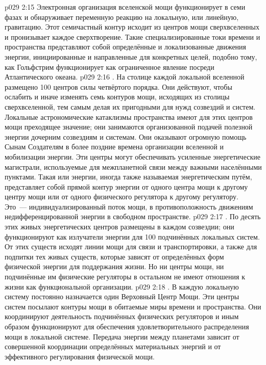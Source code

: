 \vs p029 2:15 Электронная организация вселенской мощи функционирует в семи фазах и обнаруживает переменную реакцию на локальную, или линейную, гравитацию. Этот семичастный контур исходит из центров мощи сверхвселенных и пронизывает каждое сверхтворение. Такие специализированные токи времени и пространства представляют собой определённые и локализованные движения энергии, инициированные и направленные для конкретных целей, подобно тому, как Гольфстрим функционирует как ограниченное явление посреди Атлантического океана.
\vs p029 2:16 . На столице каждой локальной вселенной размещено 100 центров силы четвёртого порядка. Они действуют, чтобы ослабить и иначе изменять семь контуров мощи, исходящих из столицы сверхвселенной, тем самым делая их пригодными для нужд созвездий и систем. Локальные астрономические катаклизмы пространства имеют для этих центров мощи преходящее значение; они занимаются организованной подачей полезной энергии дочерним созвездиям и системам. Они оказывают огромную помощь Сынам Создателям в более поздние времена организации вселенной и мобилизации энергии. Эти центры могут обеспечивать усиленные энергетические магистрали, используемые для межпланетной связи между важными населёнными пунктами. Такая  или  энергии, иногда также называемая энергетическим путём, представляет собой прямой контур энергии от одного центра мощи к другому центру мощи или от одного физического регулятора к другому регулятору. Это~--- индивидуализированный поток мощи, в противоположность движениям недифференцированной энергии в свободном пространстве.
\vs p029 2:17 . По десять этих живых энергетических центров размещены в каждом созвездии; они функционируют как излучатели энергии для 100 подчинённых локальных систем. От этих существ исходят линии мощи для связи и транспортировки, а также для подпитки тех живых существ, которые зависят от определённых форм физической энергии для поддержания жизни. Но ни центры мощи, ни подчинённые им физические регуляторы в остальном не имеют отношения к жизни как функциональной организации.
\vs p029 2:18 . В каждую локальную систему постоянно назначается один Верховный Центр Мощи. Эти центры систем посылают контуры мощи в обитаемые миры времени и пространства. Они координируют деятельность подчинённых физических регуляторов и иным образом функционируют для обеспечения удовлетворительного распределения мощи в локальной системе. Передача энергии между планетами зависит от совершенной координации определённых материальных энергий и от эффективного регулирования физической мощи.
